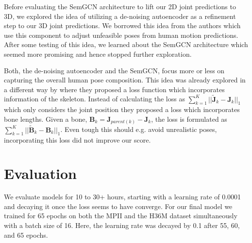 Before evaluating the SemGCN architecture to lift our 2D joint predictions to 3D, we explored the idea of utilizing a de-noising autoencoder as a refinement step to our 3D joint predictions.
We borrowed this idea from the authors \citeauthor{ghosh_learning_2017} \cite{ghosh_learning_2017} which use this component to adjust unfeasible poses from human motion predictions.
After some testing of this idea, we learned about the SemGCN architecture which seemed more promising and hence stopped further exploration.


Both, the de-noising autoencoder and the SemGCN, focus more or less on capturing the overall human pose composition.
This idea was already explored in a different way by \citeauthor{sun_compositional_2017} \cite{sun_compositional_2017}
where they proposed a loss function which incorporates information of the skeleton.
Instead of calculating the loss as $\sum_{k=1}^K ||\tilde{\mathbf{J}}_k-\mathbf{J}_k||_1$ which only considers the joint position they proposed a loss which incorporates bone lengths.
Given a bone, $\mathbf{B}_k=\mathbf{J}_{parent(k)}-\mathbf{J}_k$, the loss is formulated as $\sum_{k=1}^K ||\tilde{\mathbf{B}}_k-\mathbf{B}_k||_1$.
Even tough this should e.g. avoid unrealistic poses, incorporating this loss did not improve our score.


\section{Evaluation}
We evaluate models for 10 to 30+ hours, starting with a learning rate of 0.0001 and decaying it once the loss seems to have converge.
For our final model we trained for 65 epochs on both the MPII and the H36M dataset simultaneously with a batch size of 16. Here, the learning rate was decayed by 0.1 after 55, 60, and 65 epochs.

